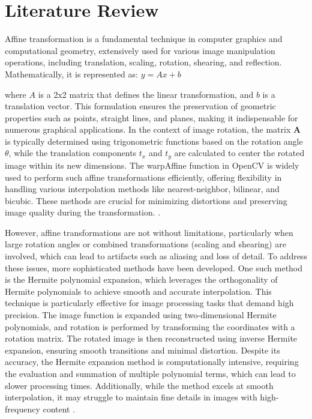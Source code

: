 \documentclass[conference]{IEEEtran}
\begin{document}
\section{Literature Review}

Affine transformation is a fundamental technique in computer graphics and computational geometry, 
extensively used for various image manipulation operations, including translation, scaling, rotation, shearing, and reflection. Mathematically, it is represented as: $ y = Ax + b $

where $A$ is a 2x2 matrix that defines the linear transformation, 
and $b$ is a translation vector. This formulation ensures the preservation 
of geometric properties such as points, straight lines, and planes, making it indispensable 
for numerous graphical applications. In the context of image rotation, the matrix $\mathbf{A}$ 
is typically determined using trigonometric functions based on the rotation angle $\theta$, 
while the translation components $t_x$ and $t_y$ are calculated to center the rotated image 
within its new dimensions. The warpAffine function in OpenCV is widely used to perform 
such affine transformations efficiently, offering flexibility in handling various interpolation 
methods like nearest-neighbor, bilinear, and bicubic. These methods are crucial for minimizing 
distortions and preserving image quality during the transformation. \cite{wang2021panoramic}.

However, affine transformations are not without limitations, 
particularly when large rotation angles or combined transformations (scaling and shearing) 
are involved, which can lead to artifacts such as aliasing and loss of detail. 
To address these issues, more sophisticated methods have been developed. One such method is the Hermite polynomial expansion, which leverages the orthogonality of Hermite polynomials to achieve smooth and accurate interpolation. This technique is particularly effective for image processing tasks that demand high precision. The image function is expanded using two-dimensional Hermite polynomials, and rotation is performed by transforming the coordinates with a rotation matrix. The rotated image is then reconstructed using inverse Hermite expansion, ensuring smooth transitions and minimal distortion. Despite its accuracy, the Hermite expansion method is computationally intensive, requiring the evaluation and summation of multiple polynomial terms, which can lead to slower processing times. Additionally, while the method excels at smooth interpolation, it may struggle to maintain fine details in images with high-frequency content \cite{park2009accurate}.
\end{document}

